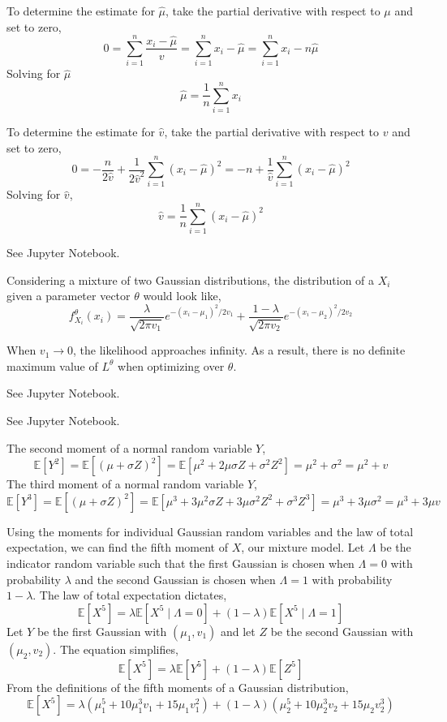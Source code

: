 \documentclass[12pt,twoside]{article}
\begin{document}
\begin{problems}
\begin{problemparts}
To determine the estimate for $\hat{\mu}$, take the partial derivative with
respect to $\mu$ and set to zero,
$$ 0 = \sum_{i = 1}^n \frac{x_i - \hat{\mu}}{v} = \sum_{i = 1}^n x_i - 
\hat{\mu} = \sum_{i = 1}^n x_i - n \hat{\mu} $$
Solving for $\hat{\mu}$
$$ \hat{\mu} = \frac{1}{n} \sum_{i = 1}^n x_i $$

To determine the estimate for $\hat{v}$, take the partial derivative with
respect to $v$ and set to zero,
$$ 0 = -\frac{n}{2\hat{v}} + \frac{1}{2 \hat{v}^2} \sum_{i = 1}^n (x_i - 
\hat{\mu})^2 = -n + \frac{1}{\hat{v}} \sum_{i = 1}^n (x_i - \hat{\mu})^2 $$
Solving for $\hat{v}$,
$$ \hat{v} = \frac{1}{n} \sum_{i = 1}^n (x_i - \hat{\mu})^2 $$

\problempart %

See Jupyter Notebook.

\problempart %
Considering a mixture of two Gaussian distributions, the distribution of a $X_i$
given a parameter vector $\theta$ would look like,
$$ f_{X_i}^\theta(x_i) = \frac{\lambda}{\sqrt{2 \pi v_1}} e^{-(x_i - \mu_1)^2 
/ 2 v_1} + \frac{1 - \lambda}{\sqrt{2 \pi v_2}} e^{-(x_i - \mu_2)^2 / 2 v_2} $$

\problempart %

When $v_1 \longrightarrow 0$, the likelihood approaches infinity. As a result,
there is no definite maximum value of $L^\theta$ when optimizing over $\theta$.

\problempart %

See Jupyter Notebook.

\problempart %

See Jupyter Notebook.

\problempart %

The second moment of a normal random variable $Y$,
$$ \mathbb{E}[Y^2] = \mathbb{E}[(\mu + \sigma Z)^2] = \mathbb{E}[\mu^2 + 2 \mu 
\sigma Z  + \sigma^2 Z^2] = \mu^2 + \sigma^2 = \mu^2 + v $$
The third moment of a normal random variable $Y$,
$$ \mathbb{E}[Y^3] = \mathbb{E}[(\mu + \sigma Z)^2] = \mathbb{E}[\mu^3 + 3 
\mu^2 \sigma Z + 3 \mu \sigma^2 Z^2 + \sigma^3 Z^3] = \mu^3 + 3 \mu \sigma^2 =
\mu^3 + 3 \mu v $$

Using the moments for individual Gaussian random variables and the law of
total expectation, we can find the fifth moment of $X$, our mixture model. 
Let $\Lambda$ be the indicator random variable such that the first Gaussian 
is chosen when $\Lambda = 0$ with probability $\lambda$ and the second 
Gaussian is chosen when $\Lambda = 1$ with probability $1 - \lambda$. The
law of total expectation dictates,
$$ \mathbb{E}[X^5] = \lambda \mathbb{E}[X^5 \mid \Lambda = 0] + (1 - 
\lambda) \mathbb{E}[X^5 \mid \Lambda = 1] $$
Let $Y$ be the first Gaussian with $(\mu_1, v_1)$ and let $Z$ be the second
Gaussian with $(\mu_2, v_2)$. The equation simplifies,
$$ \mathbb{E}[X^5] = \lambda \mathbb{E}[Y^5] + (1 - \lambda) \mathbb{E}[Z^5] $$
From the definitions of the fifth moments of a Gaussian distribution,
$$ \mathbb{E}[X^5] = \lambda (\mu_1^5 + 10 \mu_1^3 v_1 + 15 \mu_1 v_1^2) + (1
- \lambda) (\mu_2^5 + 10 \mu_2^3 v_2 + 15 \mu_2 v_2^3) $$


\end{problemparts}
\end{problems}
\end{document}
